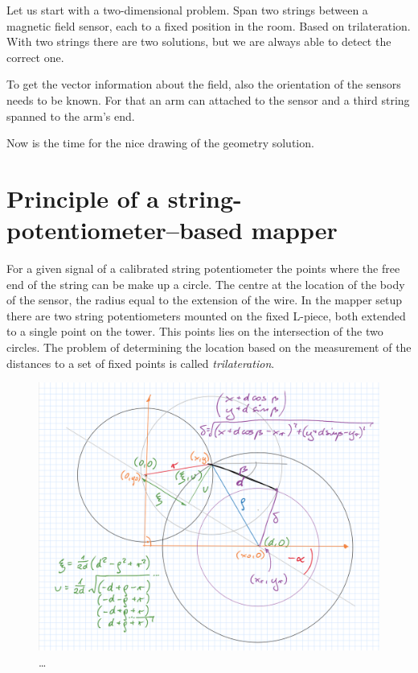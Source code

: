 Let us start with a two-dimensional problem. Span two strings between a magnetic field sensor, each to a fixed position in the room. Based on trilateration. With two strings there are two solutions, but we are always able to detect the correct one.

To get the vector information about the field, also the orientation of the sensors needs to be known. For that an arm can attached to the sensor and a third string spanned to the arm's end.

Now is the time for the nice drawing of the geometry solution.



\section{Principle of a string-potentiometer--based mapper}
For a given signal of a calibrated string potentiometer the points where the free end of the string can be make up a circle. The centre at the location of the body of the sensor, the radius equal to the extension of the wire. In the mapper setup there are two string potentiometers mounted on the fixed L-piece, both extended to a single point on the tower. This points lies on the intersection of the two circles. The problem of determining the location based on the measurement of the distances to a set of fixed points is called \emph{trilateration}.


\begin{figure}
  \centering
  \includegraphics[width=0.9\linewidth]{gfx/mapping/geometry.png}
  \caption{\ldots}
  \label{fig:mapping_geometry}
\end{figure}

